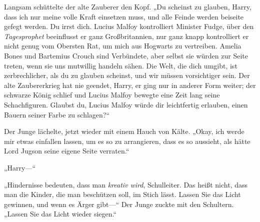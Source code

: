 Langsam schüttelte der alte Zauberer den Kopf. „Du scheinst zu glauben, Harry, dass ich nur meine volle Kraft einsetzen muss, und alle Feinde werden beiseite gefegt werden. Du irrst dich. Lucius Malfoy kontrolliert Minister Fudge, über den \emph{Tagesprophet} beeinflusst er ganz Großbritannien, nur ganz knapp kontrolliert er nicht genug vom Obersten Rat, um mich aus Hogwarts zu vertreiben. Amelia Bones und Bartemius Crouch sind Verbündete, aber selbst sie würden zur Seite treten, wenn sie uns mutwillig handeln sähen. Die Welt, die dich umgibt, ist zerbrechlicher, als du zu glauben scheinst, und wir müssen vorsichtiger sein. Der alte Zaubererkrieg hat nie geendet, Harry, er ging nur in anderer Form weiter; der schwarze König schlief und Lucius Malfoy bewegte eine Zeit lang seine Schachfiguren. Glaubst du, Lucius Malfoy würde dir leichtfertig erlauben, einen Bauern seiner Farbe zu schlagen?“

Der Junge lächelte, jetzt wieder mit einem Hauch von Kälte. „Okay, ich werde mir etwas einfallen lassen, um es so zu arrangieren, dass es so aussieht, als hätte Lord Jugson seine eigene Seite verraten.“

„Harry—“

„Hindernisse bedeuten, dass man \emph{kreativ wird}, Schulleiter. Das heißt nicht, dass man die Kinder, die man beschützen soll, im Stich lässt. Lassen Sie das Licht gewinnen, und wenn es Ärger gibt—“ Der Junge zuckte mit den Schultern. „Lassen Sie das Licht wieder siegen.“

